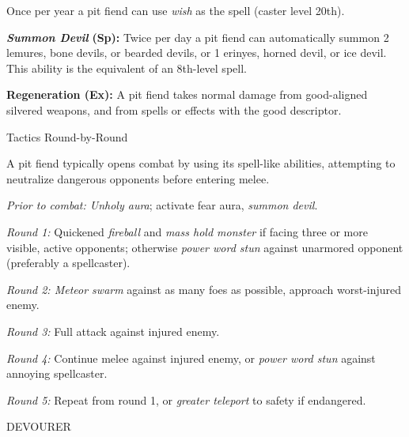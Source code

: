 \documentclass{article}
\begin{document}
Once per year a pit fiend can use \textit{wish }as the spell (caster level 20th).

\textit{\textbf{Summon Devil }}\textbf{(Sp):} Twice per day a pit fiend can automatically 
summon 2 lemures, bone devils, or bearded devils, or 1 erinyes, horned devil, or 
ice devil. This ability is the equivalent of an 8th-level spell. 

\textbf{Regeneration (Ex):} A pit fiend takes normal damage from good-aligned silvered 
weapons, and from spells or effects with the good descriptor.

Tactics Round-by-Round

A pit fiend typically opens combat by using its spell-like abilities, attempting 
to neutralize dangerous opponents before entering melee.

\textit{Prior to combat: Unholy aura}; activate fear aura, \textit{summon devil}.

\textit{Round 1: }Quickened \textit{fireball }and \textit{mass hold monster }if 
facing three or more visible, active opponents; otherwise \textit{power word stun 
}against unarmored opponent (preferably a spellcaster).

\textit{Round 2: Meteor swarm }against as many foes as possible, approach worst-injured 
enemy.

\textit{Round 3: }Full attack against injured enemy.

\textit{Round 4: }Continue melee against injured enemy, or \textit{power word stun 
}against annoying spellcaster.

\textit{Round 5: }Repeat from round 1, or \textit{greater teleport }to safety if 
endangered.

\vspace{12pt}
{\LARGE{}DEVOURER}
\end{document}
